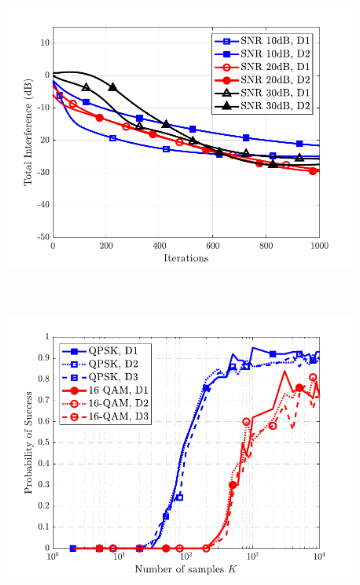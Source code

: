 \begin{figure}
\begin{subfigure}[t]{0.32\textwidth}
		\label{wfcma:fig:wf_msr_4qam_M8L4}
	\end{subfigure}\hfill
	\begin{subfigure}[t]{0.32\textwidth}
		\includegraphics[width=\linewidth]{./figs/wfcma_figs/BF_WF_MSR_TI_16QAM_L=4_M=8_J=2_K=400_2.pdf}	
		\label{wfcma:fig:wf_msr_16qam_M8L4}
	\end{subfigure}
	\\
	\begin{subfigure}[t]{0.32\textwidth}
		\includegraphics[width=\linewidth]{./figs/wfcma_figs/BF_WF_MSR_sucess_allmods_L=9_M=16_T=1000_mu=1e-4_gamma=1.pdf}

\end{subfigure}
\end{figure}
